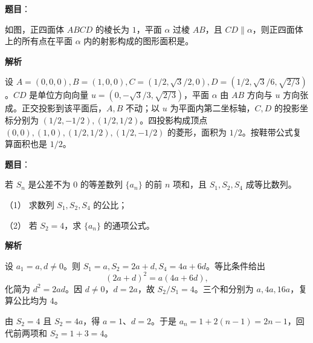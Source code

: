 \begin{answer}

\textbf{题目}：

如图，正四面体 $ABCD$ 的棱长为 $1$，平面 $\alpha$ 过棱 $AB$，且 $CD\parallel\alpha$，则正四面体上的所有点在平面 $\alpha$ 内的射影构成的图形面积是\gkblank{}。
\nopagebreak[4]
\begin{center}\end{center}
\nopagebreak[4]
\textbf{解析}

设 $A=(0,0,0),B=(1,0,0),C=(1/2,\sqrt3/2,0),D=(1/2,\sqrt3/6,\sqrt{2/3})$。$CD$ 是单位方向向量 $u=(0,-\sqrt3/3,\sqrt{2/3})$，平面 $\alpha$ 由 $AB$ 方向与 $u$ 方向张成。正交投影到该平面后，$A,B$ 不动；以 $u$ 为平面内第二坐标轴，$C,D$ 的投影坐标分别为 $(1/2,-1/2),(1/2,1/2)$。四投影构成顶点 $(0,0),(1,0),(1/2,1/2),(1/2,-1/2)$ 的菱形，面积为 $1/2$。按鞋带公式复算面积也是 $1/2$。


\end{answer}
\begin{answer}

\textbf{题目}：

若 $S_n$ 是公差不为 $0$ 的等差数列 $\{a_n\}$ 的前 $n$ 项和，且 $S_1,S_2,S_4$ 成等比数列。

（1） 求数列 $S_1,S_2,S_4$ 的公比；

（2） 若 $S_2=4$，求 $\{a_n\}$ 的通项公式。

\textbf{解析}


设 $a_1=a,d\ne0$。则 $S_1=a,S_2=2a+d,S_4=4a+6d$。等比条件给出
\nopagebreak[4]
\[
 (2a+d)^2=a(4a+6d),
\]
化简为 $d^2=2ad$。因 $d\ne0$，$d=2a$，故 $S_2/S_1=4$。三个和分别为 $a,4a,16a$，复算公比均为 $4$。


由 $S_2=4$ 且 $S_2=4a$，得 $a=1$、$d=2$。于是 $a_n=1+2(n-1)=2n-1$，回代前两项和 $S_2=1+3=4$。



\end{answer}
